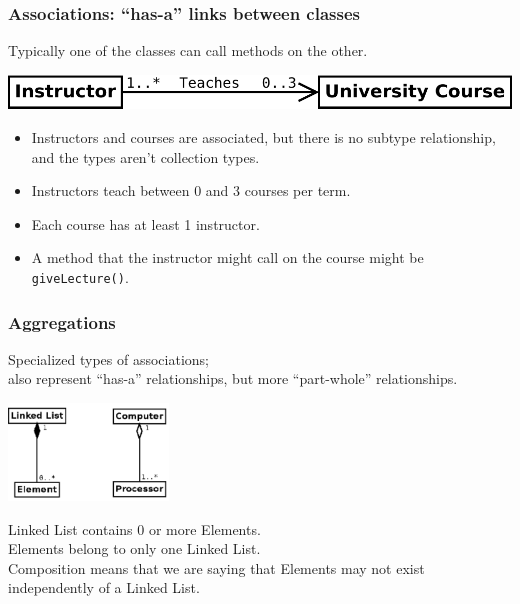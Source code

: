 \begin{frame}
\frametitle{Associations: ``has-a'' links between classes}

\begin{changemargin}{1cm}
Typically one of the
classes can call methods on the other.
\begin{center}
\includegraphics[width=.5\textwidth]{images/association.pdf}
\end{center}

\begin{itemize}
\item Instructors and courses are associated, but there is no subtype
relationship, and the types aren't collection types. 

\item Instructors
teach between 0 and 3 courses per term. 

\item Each course has at least 1
instructor. 

\item A method that the
instructor might call on the course might be {\tt giveLecture()}.
\end{itemize}
\end{changemargin}
\end{frame}

\begin{frame}
\frametitle{Aggregations}

\begin{changemargin}{1cm}
Specialized
types of associations; \\
also represent ``has-a'' relationships, but
more ``part-whole'' relationships.
\begin{center}
\includegraphics[height=7em]{images/aggr-comp.pdf}
\end{center}
Linked List contains 0 or more Elements.\\
Elements belong to only
one Linked List.\\[1em]

Composition means that we are
saying that Elements may not exist independently of a Linked List.
\end{changemargin}
\end{frame}

